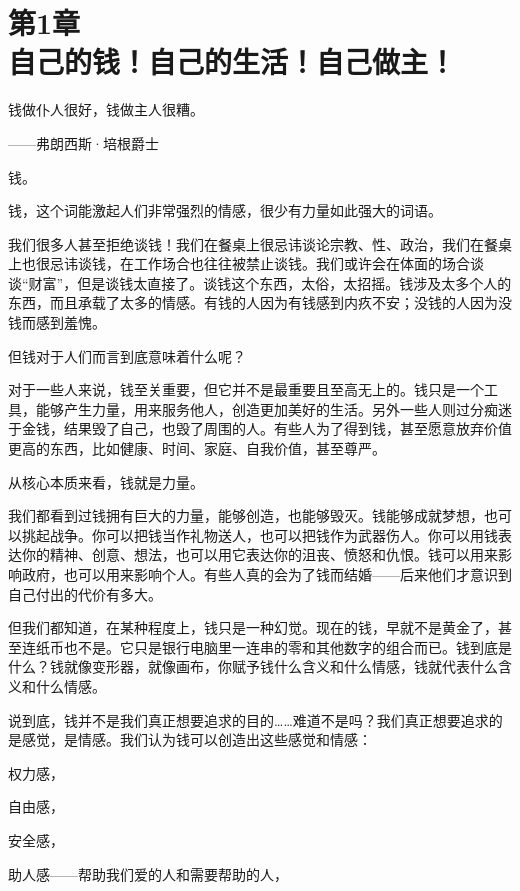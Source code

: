 
\section[第1章\q 自己的钱！自己的生活！自己做主！]{第1章\\ 自己的钱！自己的生活！自己做主！}

\begin{BookQuote}
钱做仆人很好，钱做主人很糟。

\hfill ——弗朗西斯·培根爵士
\end{BookQuote}

钱。

钱，这个词能激起人们非常强烈的情感，很少有力量如此强大的词语。

我们很多人甚至拒绝谈钱！我们在餐桌上很忌讳谈论宗教、性、政治，我们在餐桌上也很忌讳谈钱，在工作场合也往往被禁止谈钱。我们或许会在体面的场合谈谈“财富”，但是谈钱太直接了。谈钱这个东西，太俗，太招摇。钱涉及太多个人的东西，而且承载了太多的情感。有钱的人因为有钱感到内疚不安；没钱的人因为没钱而感到羞愧。

但钱对于人们而言到底意味着什么呢？

对于一些人来说，钱至关重要，但它并不是最重要且至高无上的。钱只是一个工具，能够产生力量，用来服务他人，创造更加美好的生活。另外一些人则过分痴迷于金钱，结果毁了自己，也毁了周围的人。有些人为了得到钱，甚至愿意放弃价值更高的东西，比如健康、时间、家庭、自我价值，甚至尊严。

从核心本质来看，钱就是力量。

我们都看到过钱拥有巨大的力量，能够创造，也能够毁灭。钱能够成就梦想，也可以挑起战争。你可以把钱当作礼物送人，也可以把钱作为武器伤人。你可以用钱表达你的精神、创意、想法，也可以用它表达你的沮丧、愤怒和仇恨。钱可以用来影响政府，也可以用来影响个人。有些人真的会为了钱而结婚——后来他们才意识到自己付出的代价有多大。

但我们都知道，在某种程度上，钱只是一种幻觉。现在的钱，早就不是黄金了，甚至连纸币也不是。它只是银行电脑里一连串的零和其他数字的组合而已。钱到底是什么？钱就像变形器，就像画布，你赋予钱什么含义和什么情感，钱就代表什么含义和什么情感。

说到底，钱并不是我们真正想要追求的目的……难道不是吗？我们真正想要追求的是感觉，是情感。我们认为钱可以创造出这些感觉和情感：

权力感，

自由感，

安全感，

助人感——帮助我们爱的人和需要帮助的人，

